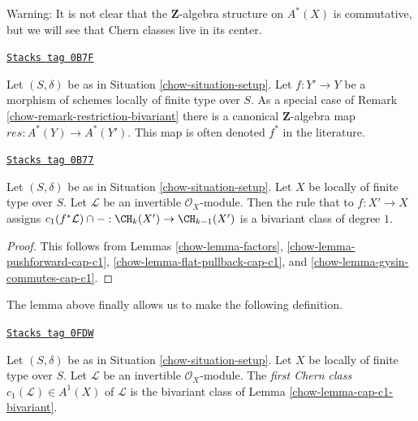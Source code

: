 Warning: It is not clear that the $\mathbf{Z}$-algebra structure
on $A^*(X)$ is commutative, but we will see that Chern classes live
in its center.

\begin{remark}
\label{chow-remark-pullback-cohomology}
\href{https://stacks.math.columbia.edu/tag/0B7F}{\texttt{Stacks tag 0B7F}}

Let $(S, \delta)$ be as in Situation \ref{chow-situation-setup}.
Let $f : Y' \to Y$ be a morphism of schemes locally of finite type over $S$.
As a special case of Remark \ref{chow-remark-restriction-bivariant}
there is a canonical $\mathbf{Z}$-algebra map $res : A^*(Y) \to A^*(Y')$.
This map is often denoted $f^*$ in the literature.
\end{remark}

\begin{lemma}
\label{chow-lemma-cap-c1-bivariant}
\href{https://stacks.math.columbia.edu/tag/0B77}{\texttt{Stacks tag 0B77}}

Let $(S, \delta)$ be as in Situation \ref{chow-situation-setup}.
Let $X$ be locally of finite type over $S$.
Let $\mathcal{L}$ be an invertible $\mathcal{O}_X$-module.
Then the rule that to $f : X' \to X$ assigns
$c_1(f^*\mathcal{L}) \cap - : \CH_k(X') \to \CH_{k - 1}(X')$
is a bivariant class of degree $1$.
\end{lemma}

\begin{proof}

This follows from Lemmas \ref{chow-lemma-factors},
\ref{chow-lemma-pushforward-cap-c1},
\ref{chow-lemma-flat-pullback-cap-c1}, and
\ref{chow-lemma-gysin-commutes-cap-c1}.
\end{proof}

The lemma above finally allows us to make the following definition.

\begin{definition}
\label{chow-definition-first-chern-class}
\href{https://stacks.math.columbia.edu/tag/0FDW}{\texttt{Stacks tag 0FDW}}

Let $(S, \delta)$ be as in Situation \ref{chow-situation-setup}. Let $X$
be locally of finite type over $S$. Let $\mathcal{L}$ be an invertible
$\mathcal{O}_X$-module. The {\it first Chern class}
$c_1(\mathcal{L}) \in A^1(X)$ of $\mathcal{L}$
is the bivariant class of Lemma \ref{chow-lemma-cap-c1-bivariant}.
\end{definition}

